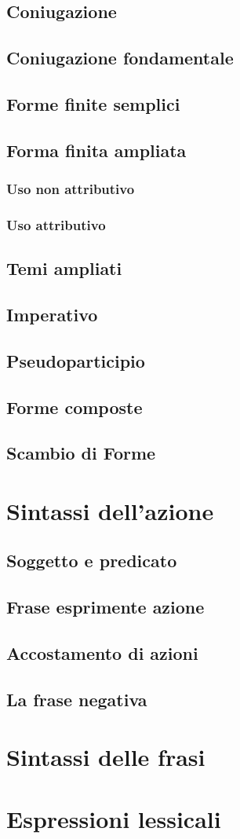 \documentclass[11pt,a4paper]{amsart}
\begin{document}
\subsection{Coniugazione}
\subsection{Coniugazione fondamentale}
\subsection{Forme finite semplici}
\subsection{Forma finita ampliata}
\subsubsection{Uso non attributivo}
\subsubsection{Uso attributivo}
\subsection{Temi ampliati}
\subsection{Imperativo}
\subsection{Pseudoparticipio}
\subsection{Forme composte}
\subsection{Scambio di Forme}
\section{Sintassi dell'azione}
\subsection{Soggetto e predicato}
\subsection{Frase esprimente azione}
\subsection{Accostamento di azioni}
\subsection{La frase negativa}
\section{Sintassi delle frasi}
\section{Espressioni lessicali}

\nocite{*}


\end{document}
